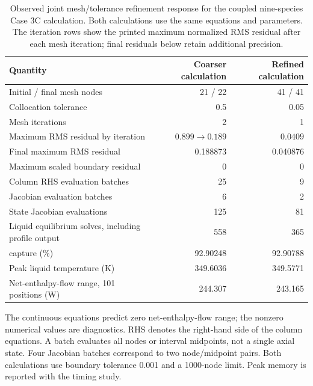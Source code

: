 \begin{table}[pos=htbp]
  \centering
  \caption{Observed joint mesh/tolerance refinement response for the coupled nine-species Case 3C calculation. Both calculations use the same equations and parameters. The iteration rows show the printed maximum normalized RMS residual after each mesh iteration; final residuals below retain additional precision.}
  \label{tab:reactive-numerical-verification}
  \small
  \renewcommand{\arraystretch}{1.12}
  \begin{tabularx}{\textwidth}{@{}Xrr@{}}
    \toprule
    Quantity & Coarser calculation & Refined calculation \\
    \midrule
    Initial / final mesh nodes & 21 / 22 & 41 / 41 \\
    Collocation tolerance & 0.5 & 0.05 \\
    Mesh iterations & 2 & 1 \\
    Maximum RMS residual by iteration & $0.899\to0.189$ & $0.0409$ \\
    Final maximum RMS residual & 0.188873 & 0.040876 \\
    Maximum scaled boundary residual & 0 & 0 \\
    Column RHS evaluation batches & 25 & 9 \\
    Jacobian evaluation batches & 6 & 2 \\
    State Jacobian evaluations & 125 & 81 \\
    Liquid equilibrium solves, including profile output & 558 & 365 \\
    \COtwo{} capture (\unit{\percent}) & 92.90248 & 92.90788 \\
    Peak liquid temperature (\unit{K}) & 349.6036 & 349.5771 \\
    Net-enthalpy-flow range, 101 positions (\unit{W}) & 244.307 & 243.165 \\
    \bottomrule
  \end{tabularx}
  \par\smallskip
  \begin{minipage}{\textwidth}\footnotesize
    The continuous equations predict zero net-enthalpy-flow range; the nonzero numerical values are diagnostics. RHS denotes the right-hand side of the column equations. A batch evaluates all nodes or interval midpoints, not a single axial state. Four Jacobian batches correspond to two node/midpoint pairs. Both calculations use boundary tolerance \num{0.001} and a 1000-node limit. Peak memory is reported with the timing study.
  \end{minipage}
\end{table}
